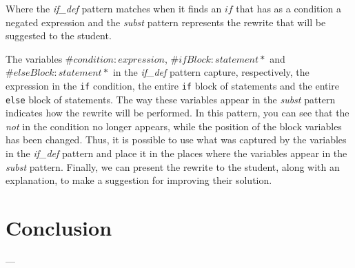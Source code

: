Where the \textit{if\_def} pattern matches when it finds an \(if\) that has as
a condition a negated expression and the \textit{subst} pattern represents the
rewrite that will be suggested to the student.

The variables \(\#condition:expression\), \(\#ifBlock:statement*\) and \(\#elseBlock:statement*\)
in the \textit{if\_def} pattern capture, respectively, the expression in the
\texttt{if} condition, the entire \texttt{if} block of statements and the entire
\texttt{else} block of statements.
The way these variables appear in the \textit{subst} pattern indicates how the
rewrite will be performed. In this pattern, you can see that the \textit{not}
in the condition no longer appears, while the position of the block variables
has been changed. Thus, it is possible to use what was captured by the variables
in the \textit{if\_def} pattern and place it in the places where the variables
appear in the \textit{subst} pattern.
Finally, we can present the rewrite to the student, along with an explanation, to
make a suggestion for improving their solution.

\section{Conclusion}\label{sec:results-conclusion}

---

\cleardoublepage
